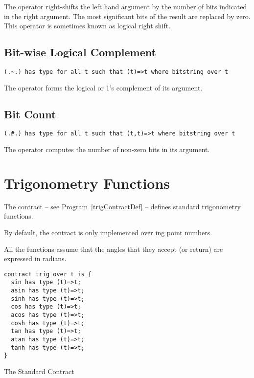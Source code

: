The  operator right-shifts the left hand argument by the number of bits indicated in the right argument. The most significant bits of the result are replaced by zero. This operator is sometimes known as logical right shift.

\subsection{\q{.\~\xspace.} Bit-wise Logical Complement}
\label{bitComplement}
\begin{lstlisting}
(.~.) has type for all t such that (t)=>t where bitstring over t
\end{lstlisting}

The  operator forms the logical or 1's complement of its argument.

\subsection{ Bit Count}
\label{bitCount}
\begin{lstlisting}
(.#.) has type for all t such that (t,t)=>t where bitstring over t
\end{lstlisting}

The  operator computes the number of non-zero bits in its argument.


\section{Trigonometry Functions}
\label{trigContract}
The  contract -- see Program~\vref{trigContractDef} -- defines standard trigonometry functions.

\begin{aside}
By default, the  contract is only implemented over ing point numbers.
\end{aside}

\begin{aside}
All the  functions assume that the angles that they accept (or return) are expressed in radians.
\end{aside}

\begin{program}
\begin{lstlisting}
contract trig over t is {
  sin has type (t)=>t;
  asin has type (t)=>t;
  sinh has type (t)=>t;
  cos has type (t)=>t;
  acos has type (t)=>t;
  cosh has type (t)=>t;
  tan has type (t)=>t;
  atan has type (t)=>t;
  tanh has type (t)=>t;
}
\end{lstlisting}
\caption{The Standard  Contract\label{trigContractDef}}
\end{program}

